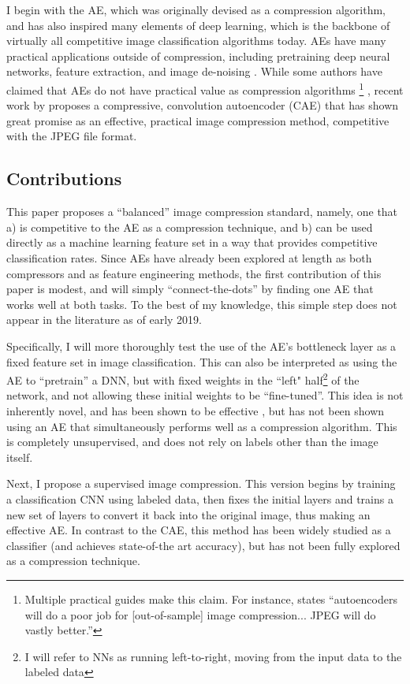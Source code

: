 \documentclass[twoside,11pt]{article}
\begin{document}
I begin with the AE, which was originally 
devised as a compression algorithm, and has also inspired many elements of 
deep learning, which is the backbone of virtually all competitive image 
classification algorithms today.
AEs have many practical applications outside of compression, including 
pretraining deep neural networks, feature extraction, 
and image de-noising \citep{baldi2012autoencoders}. While some authors have claimed that AEs do 
not have practical value as compression algorithms
\footnote{
Multiple practical guides make this claim. For instance, \citet{huben2018_tds_ae} states ``autoencoders will 
do a poor job for [out-of-sample] image compression... JPEG will do vastly better.''
}
, recent work by 
\citet{theis2017} proposes a compressive, convolution autoencoder (CAE) that 
has shown great promise as an effective, practical image compression method, 
competitive with the JPEG file format.

\subsection{Contributions}

This paper proposes a “balanced” image compression 
standard, namely, one that a) is competitive
to the AE as a compression technique, and b) can be used directly as a 
machine learning feature set in a way 
that provides competitive classification rates. Since AEs have already been explored 
at length as both compressors and as feature engineering methods, the first contribution 
of this paper is modest, and will simply “connect-the-dots” by finding one AE that 
works well at both tasks. 
To the best of my knowledge, this simple step does not appear in the literature as of early 2019.

Specifically, I will more thoroughly test the use of the AE’s bottleneck layer as a fixed feature set in image classification. This can also be interpreted as using the AE to “pretrain” a DNN, but with fixed weights in the ``left" half\footnote{I will refer to NNs as running left-to-right, moving from the input data to the labeled data} of the network, and not allowing these initial weights to be “fine-tuned”. 
This idea is not inherently novel, and has been shown to be effective \citep{bengio2006pretrain}, 
but has not been shown using an AE that simultaneously performs well as a compression algorithm. 
This is completely unsupervised, and does not rely on labels other than the image itself.

Next, I propose a supervised image compression. This version begins by training a 
classification CNN using labeled data, then fixes the initial layers and trains a 
new set of layers to convert it back into the original image, thus making an effective AE. 
In contrast to the CAE, this method has been widely studied as a classifier 
(and achieves state-of-the art accuracy), but has not been fully explored as a compression technique.
\end{document}
